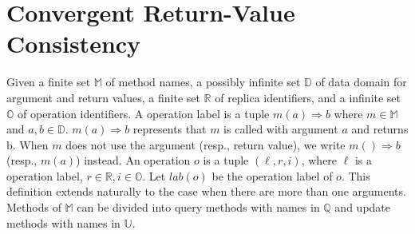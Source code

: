 
\section{Convergent Return-Value Consistency}
\label{sec:specifications and consistencies}












Given a finite set $\mathbb{M}$ of method names, a possibly infinite set $\mathbb{D}$ of data domain for argument and return values, a finite set $\mathbb{R}$ of replica identifiers, and a infinite set $\mathbb{O}$ of operation identifiers. A operation label is a tuple $m(a)\Rightarrow b$ where $m \in \mathbb{M}$ and $a,b \in \mathbb{D}$. $m(a) \Rightarrow b$ represents that $m$ is called with argument $a$ and returns b. When $m$ does not use the argument (resp., return value), we write $m()\Rightarrow b$ (resp., $m(a)$) instead. An operation $o$ is a tuple $(\ell,r,i)$, where $\ell$ is a operation label, $r \in \mathbb{R},i \in \mathbb{O}$. Let $\mathit{lab}(o)$ be the operation label of $o$. This definition extends naturally to the case when there are more than one arguments. Methods of $\mathbb{M}$ can be divided into query methods with names in $\mathbb{Q}$ and update methods with names in $\mathbb{U}$.

